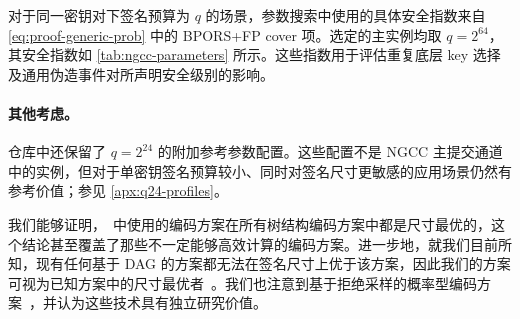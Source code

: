 对于同一密钥对下签名预算为 $q$ 的场景，参数搜索中使用的具体安全指数来自 \cref{eq:proof-generic-prob} 中的 BPORS+FP cover 项。选定的主实例均取 $q=2^{64}$，其安全指数如 \cref{tab:ngcc-parameters} 所示。这些指数用于评估重复底层 key 选择及通用伪造事件对所声明安全级别的影响。

\paragraph{其他考虑。}
仓库中还保留了 $q=2^{24}$ 的附加参考参数配置。这些配置不是 NGCC 主提交通道中的实例，但对于单密钥签名预算较小、同时对签名尺寸更敏感的应用场景仍然有参考价值；参见 \cref{apx:q24-profiles}。

我们能够证明，\WOTSCS\ 中使用的编码方案在所有树结构编码方案中都是尺寸最优的，这个结论甚至覆盖了那些不一定能够高效计算的编码方案。进一步地，就我们目前所知，现有任何基于 DAG 的方案都无法在签名尺寸上优于该方案，因此我们的方案可视为已知方案中的尺寸最优者~\cite{optimalwots}。我们也注意到基于拒绝采样的概率型编码方案~\cite{cryptoeprint:2022/778}，并认为这些技术具有独立研究价值。
